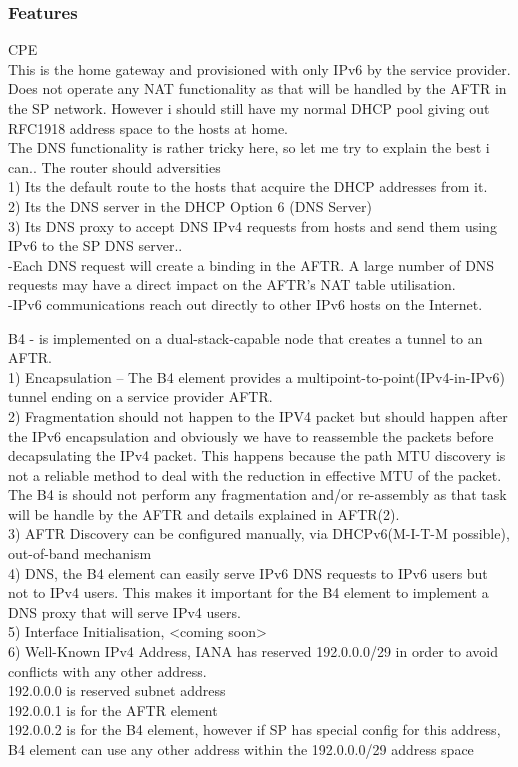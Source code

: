 \documentclass[iwp,first]{luthesis}
\begin{document}
\subsubsection {Features}
CPE 
\\This is the home gateway and provisioned with only IPv6 by the service provider. Does not operate any NAT functionality as that will be handled by the AFTR in the SP network. However i should still have my normal DHCP pool giving out RFC1918 address space to the hosts at home.
\\The DNS functionality is rather tricky here, so let me try to explain the best i can.. The router should adversities
\\1) Its the default route to the hosts that acquire the DHCP addresses from it.
\\2) Its the DNS server in the DHCP Option 6 (DNS Server)
\\3) Its DNS proxy to accept DNS IPv4 requests from hosts and send them using IPv6 to the SP DNS server..
\\-Each DNS request will create a binding in the AFTR.  A large number of DNS requests may have a direct impact on the AFTR’s NAT table utilisation.
\\-IPv6 communications reach out directly to other IPv6 hosts on the Internet.

B4 -  is implemented on a dual-stack-capable node that creates a tunnel to an AFTR.
\\1) Encapsulation – The B4 element provides a multipoint-to-point(IPv4-in-IPv6) tunnel ending on a service provider AFTR.
\\2) Fragmentation should not happen to the IPV4 packet but should happen after the IPv6 encapsulation and obviously we have to reassemble the packets before decapsulating the IPv4 packet. This happens because the path MTU discovery is not a reliable method to deal with the reduction in effective MTU of the packet. The B4 is should not perform any fragmentation and/or re-assembly as that task will be handle by the AFTR and details explained in AFTR(2).
\\3) AFTR Discovery can be configured manually, via DHCPv6(M-I-T-M possible), out-of-band mechanism
\\4) DNS, the B4 element can easily serve IPv6 DNS requests to IPv6 users but not to IPv4 users. This makes it important for the B4 element to implement a DNS proxy that will serve IPv4 users.
\\5) Interface Initialisation, <coming soon>
\\6) Well-Known IPv4 Address, IANA has reserved 192.0.0.0/29 in order to avoid conflicts with any other address.
\\192.0.0.0 is reserved subnet address
\\192.0.0.1 is for the AFTR element
\\192.0.0.2 is for the B4 element, however if SP has special config for this address, B4 element can use any other address within the 192.0.0.0/29 address space
\end{document}
